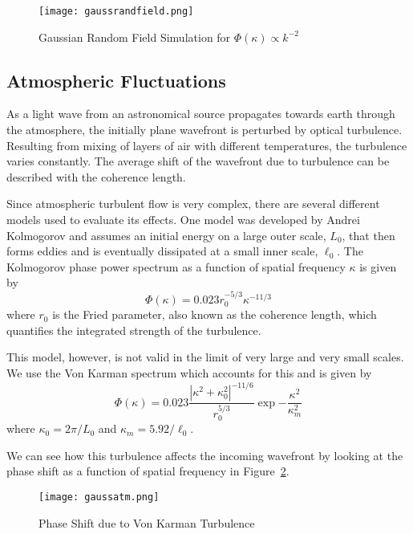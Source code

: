 \documentclass[%
 reprint,
 amsmath,amssymb,
 aps,
 pra,
]{revtex4-1}
\begin{document}
{\begin{figure}[h!]
  \centering
    \texttt{[image: gaussrandfield.png]}
  \caption{Gaussian Random Field Simulation for $\Phi(\kappa)\propto k^{-2}$}
  \label{fig:GaussianRandField}
\end{figure}

\subsection{Atmospheric Fluctuations} \label{subsec:atmosphere-model}
As a light wave from an astronomical source propagates towards earth through the atmosphere, the initially plane wavefront is perturbed by optical turbulence. Resulting from mixing of layers of air with different temperatures, the turbulence varies constantly. The average shift of the wavefront due to turbulence can be described with the coherence length. 

Since atmospheric turbulent flow is very complex, there are several different models used to evaluate its effects. One model was developed by Andrei Kolmogorov and assumes an initial energy on a large outer scale, $L_0$, that then forms eddies and is eventually dissipated at a small inner scale, $\ell_0$. The Kolmogorov phase power spectrum as a function of spatial frequency $\kappa$ is given by 
\begin{equation}
  \Phi(\kappa) = 0.023r_0^{-5/3}\kappa^{-11/3} \label{eq:kolmogorov}
\end{equation}
where $r_0$ is the Fried parameter, also known as the coherence length, which quantifies the integrated strength of the turbulence.

This model, however, is not valid in the limit of very large and very small scales. We use the Von Karman spectrum which accounts for this and is given by
\begin{equation}
  \Phi(\kappa) = 0.023\frac{|\kappa^2 + \kappa_0^2|^{-11/6}}{r_0^{5/3}}\exp{-\frac{\kappa^2}{\kappa_m^2}} \label{eq:vonkarman}
\end{equation}
where $\kappa_0 = 2\pi/L_0$ and $\kappa_m = 5.92/\ell_0$.

We can see how this turbulence affects the incoming wavefront by looking at the phase shift as a function of spatial frequency in Figure~\ref{fig:GaussATM}.
\begin{figure}[H]
  \centering
    \texttt{[image: gaussatm.png]}
  \caption{Phase Shift due to Von Karman Turbulence}
  \label{fig:GaussATM}
\end{figure}

}
\end{document}
